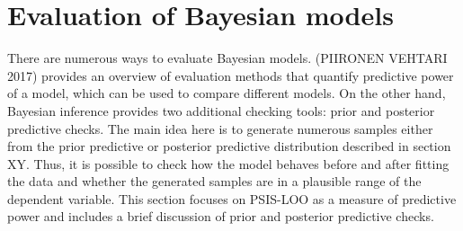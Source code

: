 \section{Evaluation of Bayesian models}

There are numerous ways to evaluate Bayesian models.
(PIIRONEN VEHTARI 2017) provides an overview of evaluation methods that quantify predictive power of a model, which can be used to compare different models.
On the other hand, Bayesian inference provides two additional checking tools: prior and posterior predictive checks.
The main idea here is to generate numerous samples either from the prior predictive or posterior predictive distribution described in section XY.
Thus, it is possible to check how the model behaves before and after fitting the data and whether the generated samples are in a plausible range of the dependent variable.
This section focuses on PSIS-LOO as a measure of predictive power and includes a brief discussion of prior and posterior predictive checks.

